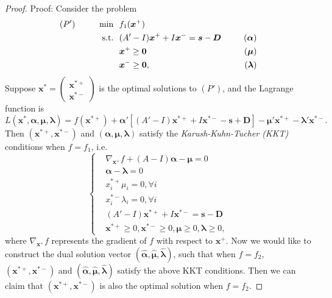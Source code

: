 \documentclass[final,11pt,3p]{article}\usepackage{setspace}
\begin{document}
\begin{proof}{Proof:}
	Consider the problem
	\begin{align*}
		(P')~~~~~~~~  \min ~~      &f_1(\boldsymbol{x}^+)\\
		\text{s.t.}~~& (A' - I) \boldsymbol{x}^+ + I \boldsymbol{x}^- = \boldsymbol{s}-\boldsymbol{D} \notag &~~~~~(\boldsymbol{\alpha})\\
		& \boldsymbol{x}^+ \ge \boldsymbol{0} \notag &~~~~~(\boldsymbol{\mu})\\
		& \boldsymbol{x}^- \ge \boldsymbol{0},\notag &~~~~~(\boldsymbol{\lambda})
	\end{align*}
	Suppose $\boldsymbol{x}^*=\begin{pmatrix}\boldsymbol{x}^{*+}\\\boldsymbol{x}^{*-}\end{pmatrix}$ is the optimal solutions to $(P')$, and the Lagrange function is
	\begin{equation*}
		L(\boldsymbol{x}^*,\boldsymbol{\alpha},\boldsymbol{\mu},\boldsymbol{\lambda}) = f(\boldsymbol{x}^{*+}) + \boldsymbol{\alpha}'[(A'-I)\boldsymbol{x}^{*+} + I\boldsymbol{x}^{*-} - \boldsymbol{s} + \boldsymbol{D}] - \boldsymbol{\mu}'\boldsymbol{x}^{*+} - \boldsymbol{\lambda}'\boldsymbol{x}^{*-}.
	\end{equation*}
	Then $(\boldsymbol{x}^{*+}, \boldsymbol{x}^{*-})$ and $(\boldsymbol{\alpha}, \boldsymbol{\mu}, \boldsymbol{\lambda})$ satisfy the \emph{Karush-Kuhn-Tucher (KKT)} conditions when $f = f_1$, i.e.
	\begin{equation*}
		\begin{cases}
			&  \nabla_{\boldsymbol{x}^+}f + (A-I)\boldsymbol{\alpha} - \boldsymbol{\mu} = 0\\
			& \boldsymbol{\alpha} - \boldsymbol{\lambda} =0\\
			& x_i^{*+}\mu_i = 0, \forall i\\
			& x_i^{*-}\lambda_i = 0, \forall i\\
			&(A' - I) \boldsymbol{x}^{*+} + I \boldsymbol{x}^{*-} = \boldsymbol{s}-\boldsymbol{D}\\
			& \boldsymbol{x}^{*+} \ge 0, \boldsymbol{x}^{*-} \ge 0,  \boldsymbol{\mu} \ge 0, \boldsymbol{\lambda} \ge 0,
		\end{cases}
	\end{equation*}
	where $\nabla_{\boldsymbol{x}^+}f$ represents the gradient of $f$ with respect to $\boldsymbol{x}^+$. Now we would like to construct the dual solution vector $(\hat{\boldsymbol{\alpha}}, \hat{\boldsymbol{\mu}}, \hat{\boldsymbol{\lambda}})$, such that when $f = f_2$, $(\boldsymbol{x}^{*+}, \boldsymbol{x}^{*-})$ and $(\hat{\boldsymbol{\alpha}}, \hat{\boldsymbol{\mu}}, \hat{\boldsymbol{\lambda}})$ satisfy the above KKT conditions. Then we can claim that $(\boldsymbol{x}^{*+}, \boldsymbol{x}^{*-})$ is also the optimal solution when $f = f_2$.

\end{proof}
\end{document}
